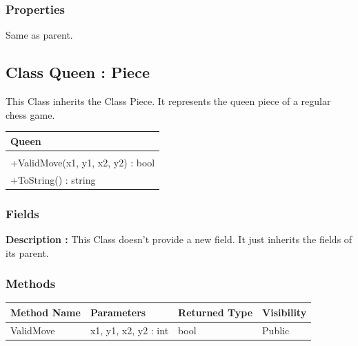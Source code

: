 \documentclass[12pt]{article}
\begin{document}
\subsubsection{Properties}

Same as parent.

\newpage


\subsection{Class Queen : Piece}

This Class inherits the Class Piece. It represents the queen 
piece of a regular chess game.
\begin{table}[H]
    \begin{tabular}{|l|}
    \hline
    \cellcolor[HTML]{C0C0C0}\textbf{Queen} \\ \hline
    \cellcolor[HTML]{EFEFEF}                    \\ \hline
    +ValidMove(x1, y1, x2, y2) : bool           \\ \hline
    +ToString() : string                        \\ \hline
    \end{tabular}
\end{table}

\subsubsection{Fields}

\textbf{Description :} This Class doesn't provide a new field. It just
inherits the fields of its parent.

\subsubsection{Methods}

\begin{table}[H]
    \begin{tabular}{|l|l|l|l|}
    \hline
    \rowcolor[HTML]{EFEFEF} 
    \cellcolor[HTML]{EFEFEF}\textbf{Method Name} & \textbf{Parameters}  & \textbf{Returned Type} & \textbf{Visibility} \\ \hline
    ValidMove                          & x1, y1, x2, y2 : int & bool                   & Public              \\ \hline
    \end{tabular}
\end{table}
\end{document}
